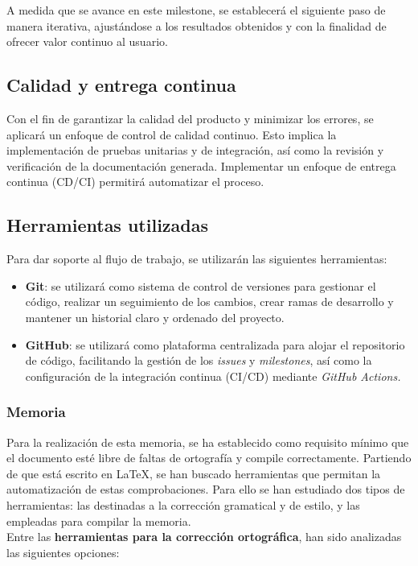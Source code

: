 A medida que se avance en este milestone, se establecerá el siguiente paso de manera iterativa,
ajustándose a los resultados obtenidos y con la finalidad de ofrecer valor continuo al usuario.

\subsection{Calidad y entrega continua}
Con el fin de garantizar la calidad del producto y minimizar los errores, se aplicará
un enfoque de control de calidad continuo. Esto implica la implementación de pruebas unitarias
y de integración, así como la revisión y verificación de la documentación generada.
Implementar un enfoque de entrega continua (CD/CI) permitirá automatizar el proceso.


\subsection{Herramientas utilizadas}
Para dar soporte al flujo de trabajo, se utilizarán las siguientes herramientas:
\begin{itemize}
    \item \textbf{Git}: se utilizará como sistema de control de versiones para gestionar el código,
    realizar un seguimiento de los cambios, crear ramas de desarrollo y mantener un historial
    claro y ordenado del proyecto.
    \item \textbf{GitHub}: se utilizará como plataforma centralizada para alojar el repositorio
    de código, facilitando la gestión de los \textit{issues} y \textit{milestones}, así como la
    configuración de la integración continua (CI/CD) mediante \textit{GitHub Actions.}
\end{itemize}

\subsubsection{Memoria}
Para la realización de esta memoria, se ha establecido como requisito mínimo que
el documento esté libre de faltas de ortografía y compile correctamente. Partiendo de que 
está escrito en \LaTeX, se han buscado herramientas que permitan la automatización de estas 
comprobaciones. Para ello se han estudiado dos tipos de herramientas: las destinadas a la
corrección gramatical y de estilo, y las empleadas para compilar la memoria.
\\

Entre las \textbf{herramientas para la corrección ortográfica}, han sido analizadas las siguientes
opciones:

